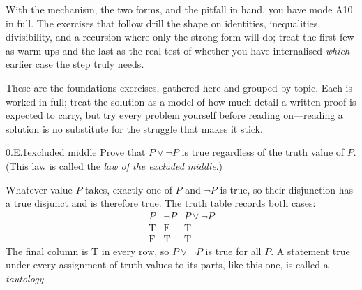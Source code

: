 \documentclass[main.tex]{subfiles}
\begin{document}
\noindent With the mechanism, the two forms, and the pitfall in hand, you have mode \textsf{A10} in
full. The exercises that follow drill the shape on identities, inequalities, divisibility, and a
recursion where only the strong form will do; treat the first few as warm-ups and the last as the real
test of whether you have internalised \emph{which} earlier case the step truly needs.

\clearpage

\noindent These are the foundations exercises, gathered here and grouped by topic. Each is worked in
full; treat the solution as a model of how much detail a written proof is expected to carry, but try
every problem yourself before reading on---reading a solution is no substitute for the struggle that
makes it stick.

\par\bigskip{}\par\nobreak\smallskip

\begin{Exercise}{0.E.1}{excluded middle}
Prove that $P\vee\neg P$ is true regardless of the truth value of $P$. (This law is called the
\emph{law of the excluded middle}.)
\end{Exercise}
\begin{Solution}
Whatever value $P$ takes, exactly one of $P$ and $\neg P$ is true, so their disjunction has a true
disjunct and is therefore true. The truth table records both cases:
\[
\begin{array}{c|cc}
P & \neg P & P\vee\neg P\\\hline
\mathrm{T} & \mathrm{F} & \mathrm{T}\\
\mathrm{F} & \mathrm{T} & \mathrm{T}
\end{array}
\]
The final column is $\mathrm{T}$ in every row, so $P\vee\neg P$ is true for all $P$. A statement true
under every assignment of truth values to its parts, like this one, is called a \emph{tautology}.
\end{Solution}
\end{document}
